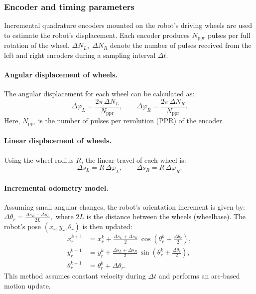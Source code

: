 \subsubsection{Encoder and timing parameters}

Incremental quadrature encoders mounted on the robot's driving wheels are used to estimate the robot's displacement. Each encoder produces \(N_\text{ppr}\) pulses per full rotation of the wheel. \(\Delta N_L,\;\Delta N_R\) denote the number of pulses received from the left and right encoders during a sampling interval \(\Delta t\).

\paragraph{Angular displacement of wheels.}
The angular displacement for each wheel can be calculated as:
\begin{equation}
    \Delta\varphi_L = \frac{2\pi\,\Delta N_L}{N_\text{ppr}},\qquad
    \Delta\varphi_R = \frac{2\pi\,\Delta N_R}{N_\text{ppr}}.
    \label{eq:wheel_angle_inc}
\end{equation}
Here, \(N_\text{ppr}\) is the number of pulses per revolution (PPR) of the encoder.

\paragraph{Linear displacement of wheels.}
Using the wheel radius \(R\), the linear travel of each wheel is:
\begin{equation}
    \Delta s_L = R\,\Delta\varphi_L,\qquad
    \Delta s_R = R\,\Delta\varphi_R.
\end{equation}

\paragraph{Incremental odometry model.}
Assuming small angular changes, the robot’s orientation increment is given by:
 $
    \Delta\theta_r = \frac{\Delta s_R - \Delta s_L}{2L},
 $
where \(2L\) is the distance between the wheels (wheelbase). The robot's pose \((x_r, y_r, \theta_r)\) is then updated:
\begin{align}
    x_r^{k+1} &= x_r^{k} + \frac{\Delta s_L + \Delta s_R}{2}\,
                \cos\!\left(\theta_r^{k} + \frac{\Delta\theta_r}{2}\right),\\[2pt]
    y_r^{k+1} &= y_r^{k} + \frac{\Delta s_L + \Delta s_R}{2}\,
                \sin\!\left(\theta_r^{k} + \frac{\Delta\theta_r}{2}\right),\\[2pt]
    \theta_r^{k+1} &= \theta_r^{k} + \Delta\theta_r.
    \label{eq:odom_update}
\end{align}
This method assumes constant velocity during \(\Delta t\) and performs an arc-based motion update.



